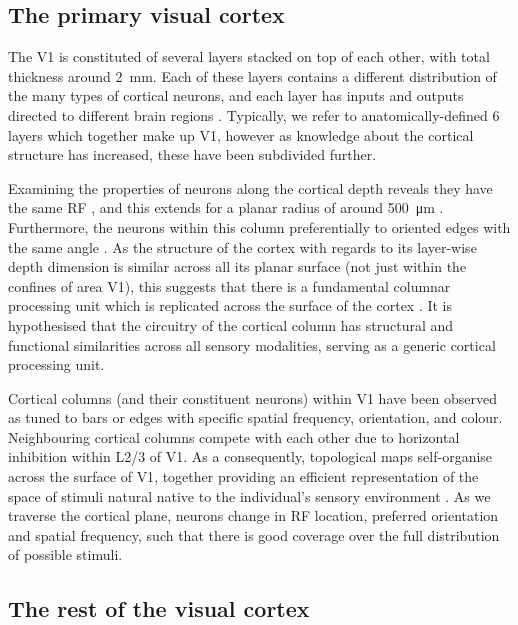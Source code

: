 \subsection{The primary visual cortex}
\label{sec:bg_v1}

The \acf{V1} is constituted of several layers stacked on top of each other, with total thickness around \SI{2}{\milli\metre}.
Each of these layers contains a different distribution of the many types of cortical neurons, and each layer has inputs and outputs directed to different brain regions \citep{Harris2013}.
Typically, we refer to anatomically-defined \num{6} layers which together make up \ac{V1}, however as knowledge about the cortical structure has increased, these have been subdivided further.

Examining the properties of neurons along the cortical depth reveals they have the same \ac{RF} \citep{Hubel1963,Hubel1962}, and this extends for a planar radius of around \SI{500}{\micro\metre} \citep{Mountcastle1997}.
Furthermore, the neurons within this column preferentially to oriented edges with the same angle \citep{Hubel1962}.
As the structure of the cortex with regards to its layer-wise depth dimension is similar across all its planar surface (not just within the confines of area \ac{V1}), this suggests that there is a fundamental columnar processing unit which is replicated across the surface of the cortex \citep{Mountcastle1957}.
It is hypothesised that the circuitry of the cortical column has structural and functional similarities across all sensory modalities, serving as a generic cortical processing unit.

Cortical columns (and their constituent neurons) within \ac{V1} have been observed as tuned to bars or edges with specific spatial frequency, orientation, and colour.
Neighbouring cortical columns compete with each other due to horizontal inhibition within \ac{L2/3} of \ac{V1}.
As a consequently, topological maps self-organise across the surface of \ac{V1}, together providing an efficient representation of the space of stimuli natural native to the individual's sensory environment \citep{Miikkulainen2005,Stevens2013,Wilson2015}.
As we traverse the cortical plane, neurons change in \ac{RF} location, preferred orientation and spatial frequency, such that there is good coverage over the full distribution of possible stimuli.


\subsection{The rest of the visual cortex}

